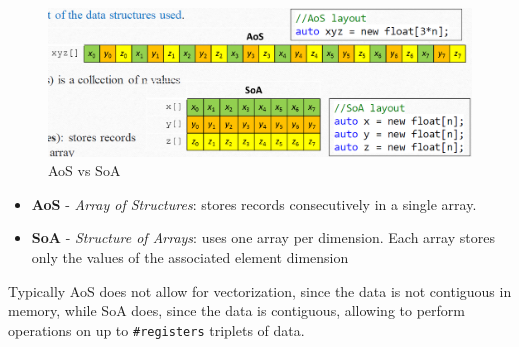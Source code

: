 \begin{paracol}{2}
   \begin{figure}[htbp]
      \centering
      \includegraphics{images/04/aos_soa.png}
      \caption{AoS vs SoA}
      \label{fig:04/aos_soa}
   \end{figure}
\end{paracol}
\begin{itemize}
   \item \textbf{AoS} - \textit{Array of Structures}: stores records consecutively in a single array.
   \item \textbf{SoA} - \textit{Structure of Arrays}: 
   uses one array per dimension. Each array stores only the values of the associated element dimension
\end{itemize}

Typically AoS does not allow for vectorization, since the data is not contiguous in memory, while SoA does, since the data is contiguous, allowing to perform operations on up to \texttt{\#registers} triplets of data.

